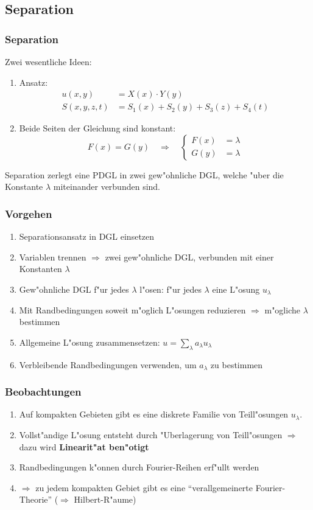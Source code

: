 \documentclass{beamer}
\begin{document}
\begin{frame}
\section{Separation}
\frametitle{Separation}
Zwei wesentliche Ideen:
\begin{enumerate}
\item Ansatz:
\begin{align*}
u(x,y)&=X(x)\cdot Y(y)\\
S(x,y,z,t)&=S_1(x)+S_2(y)+S_3(z)+S_4(t)
\end{align*}
\item Beide Seiten der Gleichung sind konstant:
\[
F(x)=G(y)\quad\Rightarrow\quad\left\{
\begin{aligned}
F(x)&=\lambda\\
G(y)&=\lambda
\end{aligned}
\right.
\]
\end{enumerate}
Separation zerlegt eine PDGL in zwei gew"ohnliche DGL, welche "uber
die Konstante $\lambda$ miteinander verbunden sind.
\end{frame}

\begin{frame}
\frametitle{Vorgehen}
\begin{enumerate}
\item Separationsansatz in DGL einsetzen
\item Variablen trennen $\Rightarrow$ zwei gew"ohnliche DGL, verbunden
mit einer Konstanten $\lambda$
\item Gew"ohnliche DGL f"ur jedes $\lambda$ l"osen: f"ur jedes $\lambda$ eine L"osung
$u_\lambda$
\item Mit Randbedingungen soweit m"oglich L"osungen reduzieren $\Rightarrow$
m"ogliche $\lambda$ bestimmen
\item Allgemeine L"osung zusammensetzen: $u = \sum_{\lambda}a_\lambda u_\lambda$
\item Verbleibende Randbedingungen verwenden, um $a_\lambda$ zu bestimmen
\end{enumerate}
\end{frame}

\begin{frame}
\frametitle{Beobachtungen}
\begin{enumerate}
\item Auf kompakten Gebieten gibt es eine diskrete Familie von Teill"osungen
$u_{\lambda}$.
\item Vollst"andige L"osung entsteht durch "Uberlagerung von Teill"osungen
$\Rightarrow$ dazu wird {\bf Linearit"at ben"otigt}
\item Randbedingungen k"onnen durch Fourier-Reihen erf"ullt werden
\item $\Rightarrow$ zu jedem kompakten Gebiet gibt es eine ``verallgemeinerte
Fourier-Theorie'' ($\Rightarrow$ Hilbert-R"aume)
\end{enumerate}
\end{frame}
\end{document}
